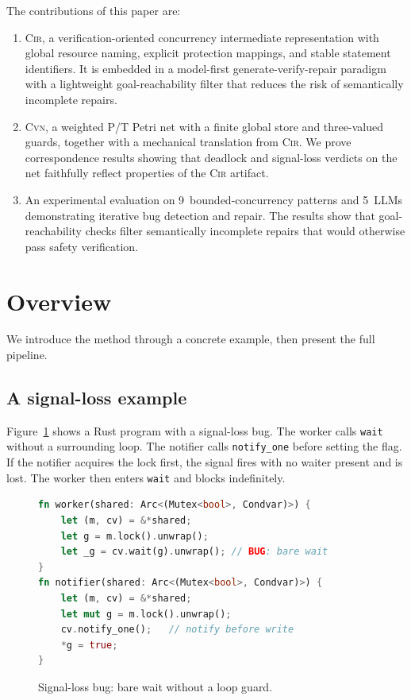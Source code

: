 \documentclass{article}
\begin{document}
\medskip\noindent
The contributions of this paper are:
\begin{enumerate}[leftmargin=*,itemsep=2pt]

\item \textsc{Cir}, a verification-oriented concurrency intermediate representation with global resource naming, explicit protection mappings, and stable statement identifiers. It is embedded in a model-first generate-verify-repair paradigm with a lightweight goal-reachability filter that reduces the risk of semantically incomplete repairs.

\item \textsc{Cvn}, a weighted P/T Petri net with a finite global store and three-valued guards, together with a mechanical translation from \textsc{Cir}. We prove correspondence results showing that deadlock and signal-loss verdicts on the net faithfully reflect properties of the \textsc{Cir} artifact.

\item An experimental evaluation on 9~bounded-concurrency patterns and 5~LLMs demonstrating iterative bug detection and repair. The results show that goal-reachability checks filter semantically incomplete repairs that would otherwise pass safety verification.

\end{enumerate}

\section{Overview}
\label{sec:overview}

We introduce the method through a concrete example, then present the full pipeline.

\subsection{A signal-loss example}
\label{subsec:running-example}

Figure~\ref{fig:example-a} shows a Rust program with a signal-loss bug. The worker calls \texttt{wait} without a surrounding loop. The notifier calls \texttt{notify\_one} before setting the flag. If the notifier acquires the lock first, the signal fires with no waiter present and is lost. The worker then enters \texttt{wait} and blocks indefinitely.

\begin{figure}[t]
\begin{lstlisting}[language=rust]
fn worker(shared: Arc<(Mutex<bool>, Condvar)>) {
    let (m, cv) = &*shared;
    let g = m.lock().unwrap();
    let _g = cv.wait(g).unwrap(); // BUG: bare wait
}
fn notifier(shared: Arc<(Mutex<bool>, Condvar)>) {
    let (m, cv) = &*shared;
    let mut g = m.lock().unwrap();
    cv.notify_one();   // notify before write
    *g = true;
}
\end{lstlisting}
\caption{Signal-loss bug: bare wait without a loop guard.}
\label{fig:example-a}
\end{figure}
\end{document}
